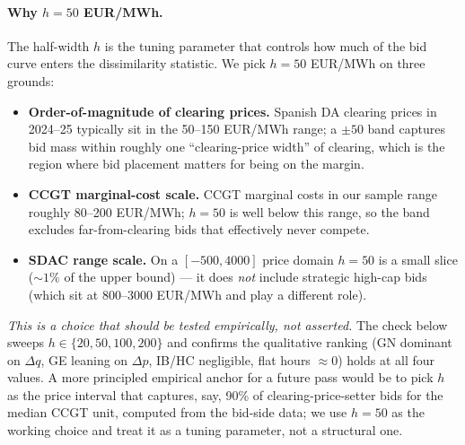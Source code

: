 \documentclass[11pt,a4paper]{article}
\begin{document}
\paragraph{Why $h = 50$ EUR/MWh.}
The half-width $h$ is the tuning parameter that controls how much of the bid curve enters the dissimilarity statistic. We pick $h = 50$ EUR/MWh on three grounds:
\begin{itemize}
\item \textbf{Order-of-magnitude of clearing prices.} Spanish DA clearing prices in 2024--25 typically sit in the 50--150 EUR/MWh range; a $\pm 50$ band captures bid mass within roughly one ``clearing-price width'' of clearing, which is the region where bid placement matters for being on the margin.
\item \textbf{CCGT marginal-cost scale.} CCGT marginal costs in our sample range roughly 80--200 EUR/MWh; $h = 50$ is well below this range, so the band excludes far-from-clearing bids that effectively never compete.
\item \textbf{SDAC range scale.} On a $[-500, 4000]$ price domain $h = 50$ is a small slice ($\sim 1\%$ of the upper bound) --- it does \emph{not} include strategic high-cap bids (which sit at 800--3000 EUR/MWh and play a different role).
\end{itemize}
\emph{This is a choice that should be tested empirically, not asserted.} The check below sweeps $h \in \{20, 50, 100, 200\}$ and confirms the qualitative ranking (GN dominant on $\Delta q$, GE leaning on $\Delta p$, IB/HC negligible, flat hours $\approx 0$) holds at all four values. A more principled empirical anchor for a future pass would be to pick $h$ as the price interval that captures, say, 90\% of clearing-price-setter bids for the median CCGT unit, computed from the bid-side data; we use $h=50$ as the working choice and treat it as a tuning parameter, not a structural one.


\end{document}
